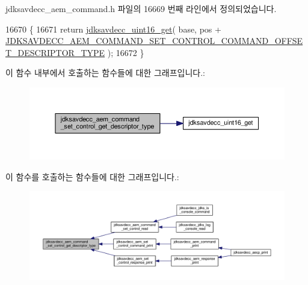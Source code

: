 jdksavdecc\+\_\+aem\+\_\+command.\+h 파일의 16669 번째 라인에서 정의되었습니다.


\begin{DoxyCode}
16670 \{
16671     \textcolor{keywordflow}{return} \hyperlink{group__endian_ga3fbbbc20be954aa61e039872965b0dc9}{jdksavdecc\_uint16\_get}( base, pos + 
      \hyperlink{group__command__set__control_ga7ee5b5f891a008e12e0a7e5542052126}{JDKSAVDECC\_AEM\_COMMAND\_SET\_CONTROL\_COMMAND\_OFFSET\_DESCRIPTOR\_TYPE}
       );
16672 \}
\end{DoxyCode}


이 함수 내부에서 호출하는 함수들에 대한 그래프입니다.\+:
\nopagebreak
\begin{figure}[H]
\begin{center}
\leavevmode
\includegraphics[width=350pt]{group__command__set__control_ga65732c036039042631d50df57dc332fe_cgraph}
\end{center}
\end{figure}




이 함수를 호출하는 함수들에 대한 그래프입니다.\+:
\nopagebreak
\begin{figure}[H]
\begin{center}
\leavevmode
\includegraphics[width=350pt]{group__command__set__control_ga65732c036039042631d50df57dc332fe_icgraph}
\end{center}
\end{figure}


